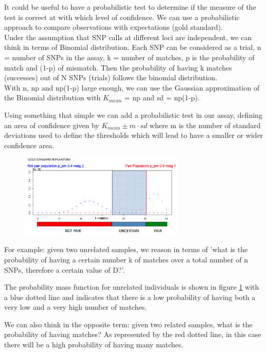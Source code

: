It could be useful to have a probabilistic test to determine if the measure of the test is correct at with which level of confidence. We can use a probabilistic approach to compare observations with expectations (gold standard).
\\
Under the assumption that SNP calls at different loci are independent, we can think in terms of Binomial distribution. Each SNP can be considered as a trial, n = number of SNPs in the assay, k = number of matches, p is the probability of match and (1-p) of mismatch. Then the probability of having k matches (successes) out of N SNPs (trials) follows the binomial distribution.
\\
With n, np and np(1-p) large enough, we can use the Gaussian approximation of the Binomial distribution with $K_{mean}$ = np and sd = np(1-p).

Using something that simple we can add a probabilistic test in our assay, defining an area of confidence given by $K_{mean} \pm m \cdot sd$ where m is the number of standard deviations used to define the thresholds which will lead to have a smaller or wider confidence area.

\begin{figure}[H]
	\centering
	\includegraphics[width=0.7\textwidth]{double_test.PNG}
	\caption{}
	\label{fig:prob_test}
\end{figure}

For example: given two unrelated samples, we reason in terms of 'what is the probability of having a certain number k of matches over a total number of n SNPs, therefore a certain value of D?'.

The probability mass function for unrelated individuals is shown in figure \ref{fig:prob_test} with a blue dotted line and indicates that there is a low probability of having both a very low and a very high number of matches.

We can also think in the opposite term: given two related samples, what is the probability of having  matches? As represented by the red dotted line, in this case there will be a high probability of having many matches.

